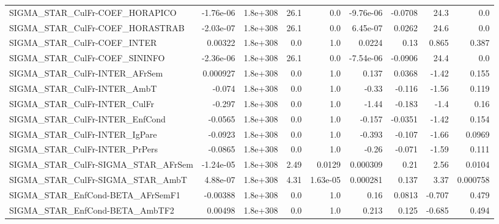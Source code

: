 \begin{tabular}{lrrrrrrrr}
SIGMA\_STAR\_CulFr-COEF\_HORAPICO        &   -1.76e-06 &     1.8e+308 &    26.1 &      0.0 &  -9.76e-06 &     -0.0708 &         24.3 &           0.0 \\
SIGMA\_STAR\_CulFr-COEF\_HORASTRAB       &   -2.03e-07 &     1.8e+308 &    26.1 &      0.0 &   6.45e-07 &      0.0262 &         24.6 &           0.0 \\
SIGMA\_STAR\_CulFr-COEF\_INTER           &     0.00322 &     1.8e+308 &     0.0 &      1.0 &     0.0224 &        0.13 &        0.865 &         0.387 \\
SIGMA\_STAR\_CulFr-COEF\_SININFO         &   -2.36e-06 &     1.8e+308 &    26.1 &      0.0 &  -7.54e-06 &     -0.0906 &         24.4 &           0.0 \\
SIGMA\_STAR\_CulFr-INTER\_AFrSem         &    0.000927 &     1.8e+308 &     0.0 &      1.0 &      0.137 &      0.0368 &        -1.42 &         0.155 \\
SIGMA\_STAR\_CulFr-INTER\_AmbT           &      -0.074 &     1.8e+308 &     0.0 &      1.0 &      -0.33 &      -0.116 &        -1.56 &         0.119 \\
SIGMA\_STAR\_CulFr-INTER\_CulFr          &      -0.297 &     1.8e+308 &     0.0 &      1.0 &      -1.44 &      -0.183 &         -1.4 &          0.16 \\
SIGMA\_STAR\_CulFr-INTER\_EnfCond        &     -0.0565 &     1.8e+308 &     0.0 &      1.0 &     -0.157 &     -0.0351 &        -1.42 &         0.154 \\
SIGMA\_STAR\_CulFr-INTER\_IgPare         &     -0.0923 &     1.8e+308 &     0.0 &      1.0 &     -0.393 &      -0.107 &        -1.66 &        0.0969 \\
SIGMA\_STAR\_CulFr-INTER\_PrPers         &     -0.0865 &     1.8e+308 &     0.0 &      1.0 &      -0.26 &      -0.071 &        -1.59 &         0.111 \\
SIGMA\_STAR\_CulFr-SIGMA\_STAR\_AFrSem    &   -1.24e-05 &     1.8e+308 &    2.49 &   0.0129 &   0.000309 &        0.21 &         2.56 &        0.0104 \\
SIGMA\_STAR\_CulFr-SIGMA\_STAR\_AmbT      &    4.88e-07 &     1.8e+308 &    4.31 & 1.63e-05 &   0.000281 &       0.137 &         3.37 &      0.000758 \\
SIGMA\_STAR\_EnfCond-BETA\_AFrSemF1      &    -0.00388 &     1.8e+308 &     0.0 &      1.0 &       0.16 &      0.0813 &       -0.707 &         0.479 \\
SIGMA\_STAR\_EnfCond-BETA\_AmbTF2        &     0.00498 &     1.8e+308 &     0.0 &      1.0 &      0.213 &       0.125 &       -0.685 &         0.494 \\

\end{tabular}
